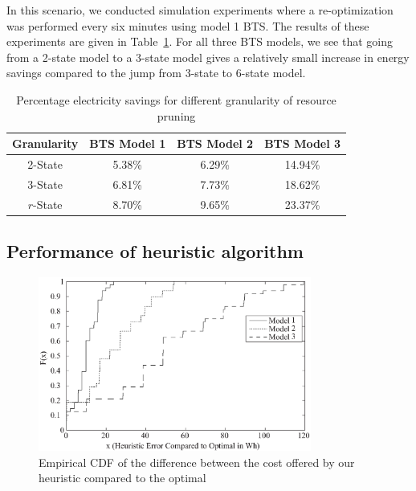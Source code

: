 In this scenario, we conducted simulation experiments where a re-optimization was performed every six minutes using model 1 BTS. The results of these experiments are given in Table~\ref{tab:granularityresults}. For all three BTS models, we see that going from a 2-state model to a 3-state model gives a relatively small increase in energy savings compared to the jump from 3-state to 6-state model.

\begin{table}
\centering
\begin{tabular}{|c|c|c|c|}
\hline
Granularity & BTS Model 1 & BTS Model 2 & BTS Model 3\\
\hline 2-State & 5.38\% & 6.29\% &  14.94\% \\
\hline 3-State & 6.81\% & 7.73\% &  18.62\% \\
\hline $r$-State & 8.70\% & 9.65\% &  23.37\% \\
\hline
\end{tabular}
\vspace{+0.1in}
\caption{Percentage electricity savings for different granularity of resource pruning}
\label{tab:granularityresults}
\end{table}

\subsection{Performance of heuristic algorithm}
\label{subsec:heur1-results}
\begin{figure}
\centering
\includegraphics[width=0.8\textwidth]{pics/ilyas6.eps}
\caption{Empirical CDF of the difference between the cost offered by our heuristic compared to the optimal}
\label{fig:results5}
\end{figure}

